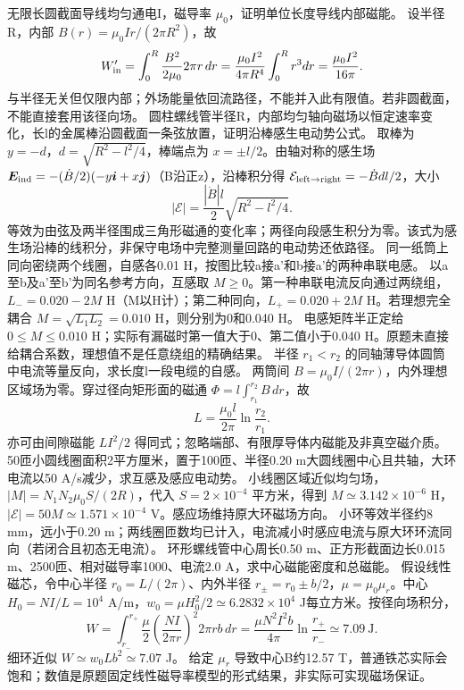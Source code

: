 \problemtext 无限长圆截面导线均匀通电I，磁导率 $\mu_0$，证明单位长度导线内部磁能。
\workings 设半径R，内部 $B(r)=\mu_0Ir/(2\pi R^2)$，故
\[
W'_{\rm in}=\int_0^R\frac{B^2}{2\mu_0}2\pi r\,dr
=\frac{\mu_0I^2}{4\pi R^4}\int_0^R r^3dr
=\frac{\mu_0I^2}{16\pi}.
\]
\crosscheck 与半径无关但仅限内部；外场能量依回流路径，不能并入此有限值。若非圆截面，不能直接套用该径向场。
\problemtext 圆柱螺线管半径R，内部均匀轴向磁场以恒定速率变化，长l的金属棒沿圆截面一条弦放置，证明沿棒感生电动势公式。
\workings 取棒为 $y=-d$，$d=\sqrt{R^2-l^2/4}$，棒端点为 $x=\pm l/2$。由轴对称的感生场 $\bm E_{\rm ind}=-(\dot B/2)(-y\bm i+x\bm j)$（B沿正z），沿棒积分得 $\mathcal E_{\rm left\to right}=-\dot Bdl/2$，大小
\[
|\mathcal E|=\frac{|\dot B|l}{2}\sqrt{R^2-l^2/4}.
\]
\crosscheck 等效为由弦及两半径围成三角形磁通的变化率；两径向段感生积分为零。该式为感生场沿棒的线积分，非保守电场中完整测量回路的电动势还依路径。
\problemtext 同一纸筒上同向密绕两个线圈，自感各0.01 H，按图比较a接a'和b接a'的两种串联电感。
\workings 以a至b及a'至b'为同名参考方向，互感取 $M\ge0$。第一种串联电流反向通过两绕组，$L_-=0.020-2M$ H（M以H计）；第二种同向，$L_+=0.020+2M$ H。若理想完全耦合 $M=\sqrt{L_1L_2}=0.010$ H，则分别为0和0.040 H。
\crosscheck 电感矩阵半正定给 $0\le M\le0.010$ H；实际有漏磁时第一值大于0、第二值小于0.040 H。原题未直接给耦合系数，理想值不是任意绕组的精确结果。
\problemtext 半径 $r_1<r_2$ 的同轴薄导体圆筒中电流等量反向，求长度l一段电缆的自感。
\workings 两筒间 $B=\mu_0I/(2\pi r)$，内外理想区域场为零。穿过径向矩形面的磁通 $\Phi=l\int_{r_1}^{r_2}B\,dr$，故
\[
L=\frac{\mu_0l}{2\pi}\ln\frac{r_2}{r_1}.
\]
\crosscheck 亦可由间隙磁能 $LI^2/2$ 得同式；忽略端部、有限厚导体内磁能及非真空磁介质。
\problemtext 50匝小圆线圈面积2平方厘米，置于100匝、半径0.20 m大圆线圈中心且共轴，大环电流以50 A/s减少，求互感及感应电动势。
\workings 小线圈区域近似均匀场，$|M|=N_1N_2\mu_0 S/(2R)$，代入 $S=2\times10^{-4}$ 平方米，得到 $M\simeq3.142\times10^{-6}$ H，$|\mathcal E|=50M\simeq1.571\times10^{-4}$ V。感应场维持原大环磁场方向。
\crosscheck 小环等效半径约8 mm，远小于0.20 m；两线圈匝数均已计入，电流减小时感应电流与原大环环流同向（若闭合且初态无电流）。
\problemtext 环形螺线管中心周长0.50 m、正方形截面边长0.015 m、2500匝、相对磁导率1000、电流2.0 A，求中心磁能密度和总磁能。
\workings 假设线性磁芯，令中心半径 $r_0=L/(2\pi)$、内外半径 $r_\pm=r_0\pm b/2$，$\mu=\mu_0\mu_r$。中心 $H_0=NI/L=10^4$ A/m，$w_0=\mu H_0^2/2\simeq6.2832\times10^4$ J每立方米。按径向场积分，
\[
W=\int_{r_-}^{r_+}\frac{\mu}{2}\left(\frac{NI}{2\pi r}\right)^2 2\pi rb\,dr
=\frac{\mu N^2I^2b}{4\pi}\ln\frac{r_+}{r_-}\simeq7.09\ \mathrm J.
\]
细环近似 $W\simeq w_0Lb^2\simeq7.07$ J。
\crosscheck 给定 $\mu_r$ 导致中心B约12.57 T，普通铁芯实际会饱和；数值是原题固定线性磁导率模型的形式结果，非实际可实现磁场保证。
